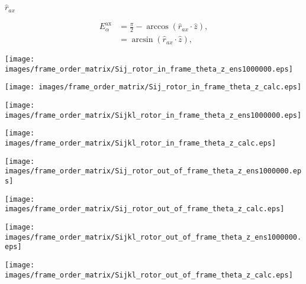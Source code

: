 \documentclass[a4paper,11pt,twoside,openright]{book}
\def\lthtmlcheckvsize{\ifdim\ht\sizebox<\vsize 
  \ifdim\wd\sizebox<\hsize\expandafter\hfill\fi \expandafter\vfill
  \else\expandafter\vss\fi}%
\begin{document}
{\newpage\clearpage
{}%
$ \hat{{r}}_{{ax}}^{}$%
\lthtmlindisplaymathZ
\lthtmlcheckvsize\clearpage}

{\newpage\clearpage
\setcounter{equation}{8}
%
\begin{subequations}\begin{align}
E_\alpha^{\textrm{ax}}&= \frac{\pi}{2} - \arccos(\hat{r}_{ax}\cdot \hat{z}), \\
&= \arcsin(\hat{r}_{ax}\cdot \hat{z}),
\end{align}\end{subequations}%
\lthtmldisplayZ
\lthtmlcheckvsize\clearpage}

{\newpage\clearpage
{}%
\texttt{[image: images/frame\_order\_matrix/Sij\_rotor\_in\_frame\_theta\_z\_ens1000000.eps]}%
\lthtmlpictureZ
\lthtmlcheckvsize\clearpage}

{\newpage\clearpage
{}%
\texttt{[image: images/frame\_order\_matrix/Sij\_rotor\_in\_frame\_theta\_z\_calc.eps]}%
\lthtmlpictureZ
\lthtmlcheckvsize\clearpage}

{\newpage\clearpage
{}%
\texttt{[image: images/frame\_order\_matrix/Sijkl\_rotor\_in\_frame\_theta\_z\_ens1000000.eps]}%
\lthtmlpictureZ
\lthtmlcheckvsize\clearpage}

{\newpage\clearpage
{}%
\texttt{[image: images/frame\_order\_matrix/Sijkl\_rotor\_in\_frame\_theta\_z\_calc.eps]}%
\lthtmlpictureZ
\lthtmlcheckvsize\clearpage}

{\newpage\clearpage
{}%
\texttt{[image: images/frame\_order\_matrix/Sij\_rotor\_out\_of\_frame\_theta\_z\_ens1000000.eps]}%
\lthtmlpictureZ
\lthtmlcheckvsize\clearpage}

{\newpage\clearpage
{}%
\texttt{[image: images/frame\_order\_matrix/Sij\_rotor\_out\_of\_frame\_theta\_z\_calc.eps]}%
\lthtmlpictureZ
\lthtmlcheckvsize\clearpage}

{\newpage\clearpage
{}%
\texttt{[image: images/frame\_order\_matrix/Sijkl\_rotor\_out\_of\_frame\_theta\_z\_ens1000000.eps]}%
\lthtmlpictureZ
\lthtmlcheckvsize\clearpage}

{\newpage\clearpage
{}%
\texttt{[image: images/frame\_order\_matrix/Sijkl\_rotor\_out\_of\_frame\_theta\_z\_calc.eps]}%
\lthtmlpictureZ
\lthtmlcheckvsize\clearpage}
\end{document}

